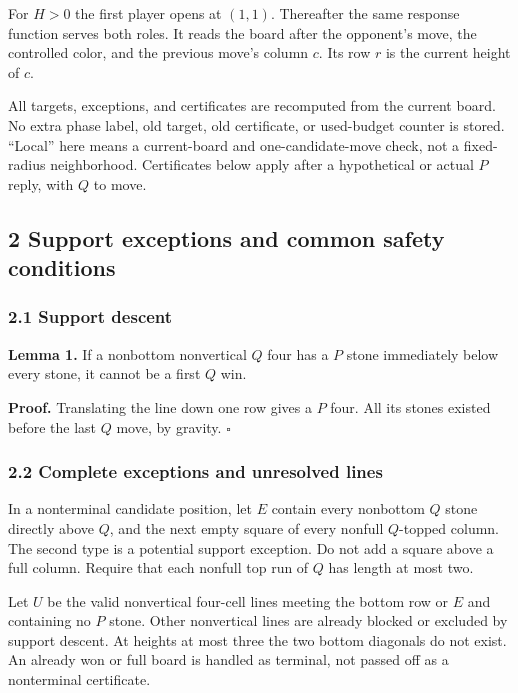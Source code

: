 \documentclass[
  a4paper,
]{article}
\begin{document}
For \(H>0\) the first player opens at \((1,1)\). Thereafter the same
response function serves both roles. It reads the board after the
opponent's move, the controlled color, and the previous move's column
\(c\). Its row \(r\) is the current height of \(c\).

All targets, exceptions, and certificates are recomputed from the
current board. No extra phase label, old target, old certificate, or
used-budget counter is stored. ``Local'' here means a current-board and
one-candidate-move check, not a fixed-radius neighborhood. Certificates
below apply after a hypothetical or actual \(P\) reply, with \(Q\) to
move.

\subsection{2 Support exceptions and common safety
conditions}\label{support-exceptions-and-common-safety-conditions}

\subsubsection{2.1 Support descent}\label{support-descent}

\textbf{Lemma 1.} If a nonbottom nonvertical \(Q\) four has a \(P\)
stone immediately below every stone, it cannot be a first \(Q\) win.

\textbf{Proof.} Translating the line down one row gives a \(P\) four.
All its stones existed before the last \(Q\) move, by gravity.
\(\square\)

\subsubsection{2.2 Complete exceptions and unresolved
lines}\label{complete-exceptions-and-unresolved-lines}

In a nonterminal candidate position, let \(E\) contain every nonbottom
\(Q\) stone directly above \(Q\), and the next empty square of every
nonfull \(Q\)-topped column. The second type is a potential support
exception. Do not add a square above a full column. Require that each
nonfull top run of \(Q\) has length at most two.

Let \(U\) be the valid nonvertical four-cell lines meeting the bottom
row or \(E\) and containing no \(P\) stone. Other nonvertical lines are
already blocked or excluded by support descent. At heights at most three
the two bottom diagonals do not exist. An already won or full board is
handled as terminal, not passed off as a nonterminal certificate.
\end{document}
